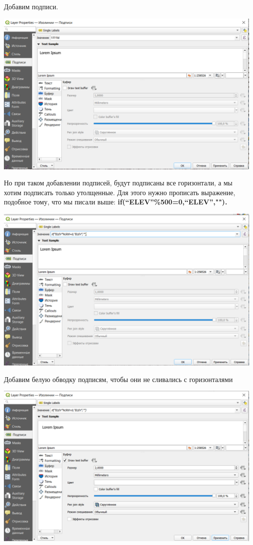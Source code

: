 \documentclass[
]{book}
\begin{document}
Добавим подписи.

\includegraphics{figures/88.PNG}

Но при таком добавлении подписей, будут подписаны все горизонтали, а мы хотим подписать только утолщенные. Для этого нужно прописать выражение, подобное тому, что мы писали выше: \textbf{if(``ELEV''\%500=0,``ELEV'',"").}

\includegraphics{figures/89.PNG}

Добавим белую обводку подписям, чтобы они не сливались с горизонталями

\includegraphics{figures/90.PNG}
\end{document}
